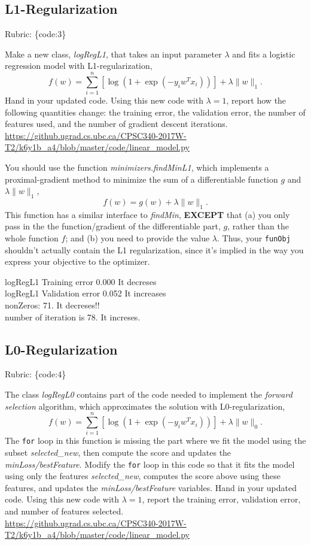 \documentclass{article}
\def\rubric#1{\gre{Rubric: \{#1\}}}{}
\def\blu#1{{\color{blu}#1}}
\def\gre#1{{\color{gre}#1}}
\def\norm#1{\|#1\|}
\begin{document}
\subsection{L1-Regularization}
\rubric{code:3}

Make a new class, \emph{logRegL1}, that takes an input parameter $\lambda$ and fits a logistic regression model with L1-regularization,
\[
f(w) = \sum_{i=1}^n \left[\log(1+\exp(-y_iw^Tx_i))\right] + \lambda\norm{w}_1.
\]
\blu{Hand in your updated code. Using this new code with $\lambda = 1$, report how the following quantities change: the training error, the validation error, the number of features used, and the number of gradient descent iterations.
\url{https://github.ugrad.cs.ubc.ca/CPSC340-2017W-T2/k6y1b_a4/blob/master/code/linear_model.py}}


You should use the function \emph{minimizers.findMinL1}, which implements a
proximal-gradient method to minimize the sum of a differentiable function $g$ and $\lambda\norm{w}_1$,
\[
f(w) = g(w) + \lambda \norm{w}_1.
\]
This function has a similar interface to \emph{findMin}, \textbf{EXCEPT} that (a) you
only pass in the the function/gradient of the differentiable
part, $g$, rather than the whole function $f$; and (b) you need to provide the value $\lambda$.
Thus, your \texttt{funObj} shouldn't actually contain the L1 regularization, since it's implied
in the way you express your objective to the optimizer. 

\blu{logRegL1 Training error 0.000  It decreses\\
logRegL1 Validation error 0.052 It increases\\
nonZeros: 71. It decreses!!\\
number of iteration is 78. It increses.
}


\subsection{L0-Regularization}
\rubric{code:4}

The class \emph{logRegL0} contains part of the code needed to implement the \emph{forward selection} algorithm,
which approximates the solution with L0-regularization,
\[
f(w) =  \sum_{i=1}^n \left[\log(1+\exp(-y_iw^Tx_i))\right] + \lambda\norm{w}_0.
\]
The \texttt{for} loop in this function is missing the part where we fit the model using the subset \emph{selected\_new},
then compute the score and updates the \emph{minLoss/bestFeature}.
Modify the \texttt{for} loop in this code so that it fits the model using only
the features \emph{selected\_new}, computes the score above using these features,
and updates the \emph{minLoss/bestFeature} variables.
\blu{Hand in your updated code. Using this new code with $\lambda=1$,
report the training error, validation error, and number of features selected.\\
\url{https://github.ugrad.cs.ubc.ca/CPSC340-2017W-T2/k6y1b_a4/blob/master/code/linear_model.py}}
\end{document}
